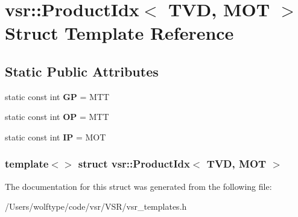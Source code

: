 \hypertarget{structvsr_1_1_product_idx_3_01_t_v_d_00_01_m_o_t_01_4}{\section{vsr\-:\-:Product\-Idx$<$ T\-V\-D, M\-O\-T $>$ Struct Template Reference}
\label{structvsr_1_1_product_idx_3_01_t_v_d_00_01_m_o_t_01_4}
}
\subsection*{Static Public Attributes}
\begin{DoxyCompactItemize}
\item 
\hypertarget{structvsr_1_1_product_idx_3_01_t_v_d_00_01_m_o_t_01_4_ad15155ba80f8c8287bb1c0cbbe5b7302}{static const int {\bfseries G\-P} = M\-T\-T}\label{structvsr_1_1_product_idx_3_01_t_v_d_00_01_m_o_t_01_4_ad15155ba80f8c8287bb1c0cbbe5b7302}

\item 
\hypertarget{structvsr_1_1_product_idx_3_01_t_v_d_00_01_m_o_t_01_4_a96db16ed39c9ec59b8a3cc9a640fb4bd}{static const int {\bfseries O\-P} = M\-T\-T}\label{structvsr_1_1_product_idx_3_01_t_v_d_00_01_m_o_t_01_4_a96db16ed39c9ec59b8a3cc9a640fb4bd}

\item 
\hypertarget{structvsr_1_1_product_idx_3_01_t_v_d_00_01_m_o_t_01_4_a0af9f11fd5ba296fae4bf4a551ee81e2}{static const int {\bfseries I\-P} = M\-O\-T}\label{structvsr_1_1_product_idx_3_01_t_v_d_00_01_m_o_t_01_4_a0af9f11fd5ba296fae4bf4a551ee81e2}

\end{DoxyCompactItemize}
\subsubsection*{template$<$$>$ struct vsr\-::\-Product\-Idx$<$ T\-V\-D, M\-O\-T $>$}



The documentation for this struct was generated from the following file\-:\begin{DoxyCompactItemize}
\item 
/\-Users/wolftype/code/vsr/\-V\-S\-R/vsr\-\_\-templates.\-h\end{DoxyCompactItemize}
